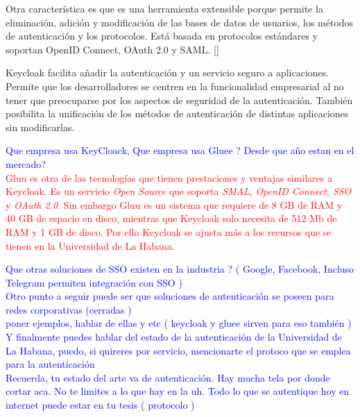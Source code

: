 	Otra característica es que es una herramienta extensible porque permite la eliminación, adición y modificación de las bases de datos de usuarios, los métodos de autenticación y los protocolos. Está basada en protocolos estándares y soportan OpenID Connect, OAuth 2.0 y SAML. [\cite{KeycloakDoc}]
	
	Keycloak facilita añadir la autenticación y un servicio seguro a aplicaciones. Permite que los desarrolladores se centren en la funcionalidad empresarial al no tener que preocuparse por los aspectos de seguridad de la autenticación. También posibilita la unificación de los métodos de autenticación de distintas aplicaciones sin modificarlas.
	
	\textcolor{blue}{Que empresa usa KeyCloack, Que empresa usa Gluee ? Desde que año estan en el mercado?}\\
	\textcolor{red}{Gluu es otra de las tecnologías que tienen prestaciones y ventajas similares a Keycloak. Es un servicio \textit{Open Source} que soporta \textit{SMAL}, \textit{OpenID Connect, SSO} y \textit{OAuth 2.0}. Sin embargo Gluu es un sistema que requiere de 8 GB de RAM y 40 GB de espacio en disco, mientras que Keycloak solo necesita de 512 Mb de RAM y 1 GB de disco. Por ello Keycloak se ajusta más a los recursos que se tienen en la Universidad de La Habana.}
	
	
	\textcolor{blue}{Que otras soluciones de SSO existen en la industria ? ( Google, Facebook, Incluso Telegram permiten integración con SSO )}
	\\
	\textcolor{blue}{Otro punto a seguir puede ser que soluciones de autenticación se poseen para redes corporativas  (cerradas )\\
	poner ejemplos, hablar de ellas y etc ( keycloak y gluee sirven para eso también )}
	\\
	\textcolor{blue}{Y finalmente puedes hablar del estado de la autenticación de la Universidad de La Habana, puedo, si quireres por servicio, mencionarte el protoco que se emplea para la autenticación}
	\\
	\textcolor{blue}{Recuerda, tu estado del arte va de autenticación. Hay mucha tela por donde cortar aca. No te limites a lo que hay en la uh. Todo lo que se autentique hoy en internet puede estar en tu tesis ( protocolo )}
	
